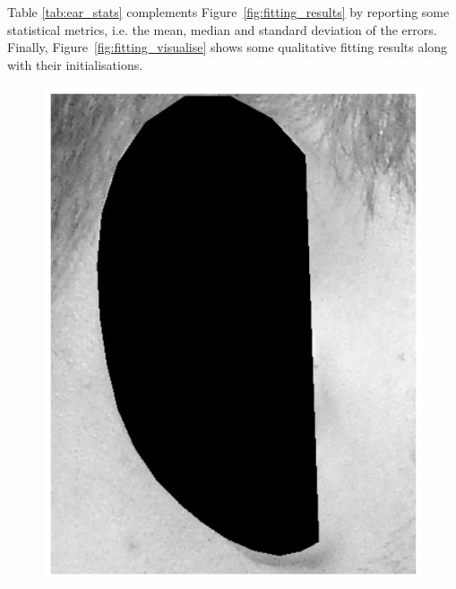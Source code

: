 Table \ref{tab:ear_stats} complements Figure~\ref{fig:fitting_results} by reporting some statistical metrics, i.e. the mean, median and standard deviation of the errors. Finally, Figure~\ref{fig:fitting_visualise} shows some qualitative fitting results along with their initialisations.







\begin{figure}[!t]
    \centering
    \newcommand{\flowhh}{0.36\columnwidth}
    \newcommand{\flowh}{0.32\columnwidth}
    \includegraphics[height=\flowhh]{resources/Ear_Deformable_Model/verification/background_exp/ear_bg_0}
    \hfill

\end{figure}

